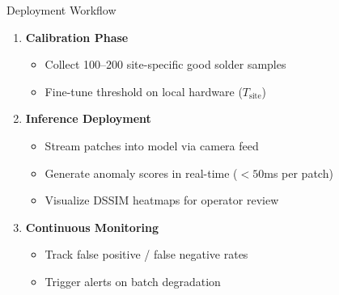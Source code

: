 \documentclass[aspectratio=169, 11pt]{beamer}
\newcommand{\emphred}[1]{\textcolor{secondary}{#1}}
\begin{document}
\begin{frame}{\emphred{Deployment Workflow}}
    \begin{enumerate}
        \item \textbf{Calibration Phase}
        \begin{itemize}
            \item Collect 100--200 site-specific good solder samples
            \item Fine-tune threshold on local hardware ($T_{\text{site}}$)
        \end{itemize}

        \item \textbf{Inference Deployment}
        \begin{itemize}
            \item Stream patches into model via camera feed
            \item Generate anomaly scores in \emphred{real-time} ($< 50$ms per patch)
            \item Visualize DSSIM heatmaps for operator review
        \end{itemize}

        \item \textbf{Continuous Monitoring}
        \begin{itemize}
            \item Track false positive / false negative rates
            \item Trigger alerts on batch degradation
        \end{itemize}
    \end{enumerate}
\end{frame}
\end{document}
